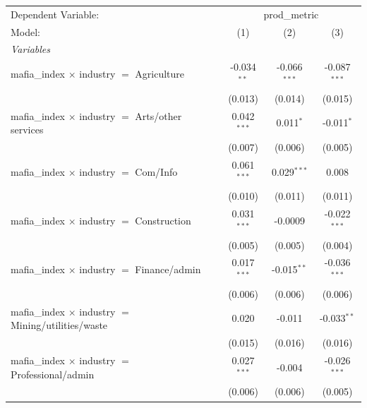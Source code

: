 
\begingroup
\centering
\begin{tabular}{lccc}
   \tabularnewline \midrule \midrule
   Dependent Variable: & \multicolumn{3}{c}{prod\_metric}\\
   Model:                                                           & (1)           & (2)            & (3)\\  
   \midrule
   \emph{Variables}\\
   mafia\_index $\times$ industry $=$ Agriculture                   & -0.034$^{**}$ & -0.066$^{***}$ & -0.087$^{***}$\\   
                                                                    & (0.013)       & (0.014)        & (0.015)\\   
   mafia\_index $\times$ industry $=$ Arts/other services           & 0.042$^{***}$ & 0.011$^{*}$    & -0.011$^{*}$\\   
                                                                    & (0.007)       & (0.006)        & (0.005)\\   
   mafia\_index $\times$ industry $=$ Com/Info                      & 0.061$^{***}$ & 0.029$^{***}$  & 0.008\\   
                                                                    & (0.010)       & (0.011)        & (0.011)\\   
   mafia\_index $\times$ industry $=$ Construction                  & 0.031$^{***}$ & -0.0009        & -0.022$^{***}$\\   
                                                                    & (0.005)       & (0.005)        & (0.004)\\   
   mafia\_index $\times$ industry $=$ Finance/admin                 & 0.017$^{***}$ & -0.015$^{**}$  & -0.036$^{***}$\\   
                                                                    & (0.006)       & (0.006)        & (0.006)\\   
   mafia\_index $\times$ industry $=$ Mining/utilities/waste        & 0.020         & -0.011         & -0.033$^{**}$\\   
                                                                    & (0.015)       & (0.016)        & (0.016)\\   
   mafia\_index $\times$ industry $=$ Professional/admin            & 0.027$^{***}$ & -0.004         & -0.026$^{***}$\\   
                                                                    & (0.006)       & (0.006)        & (0.005)\\   

\end{tabular}
